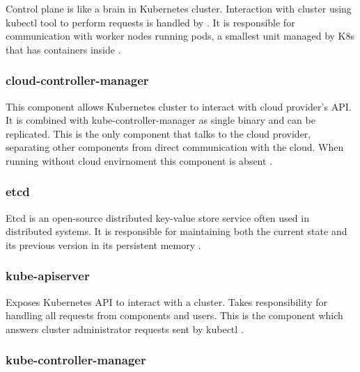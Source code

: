 Control plane is like a brain in Kubernetes cluster. Interaction with cluster using kubectl tool to perform requests is handled by \textit{}. It is responsible for communication with worker nodes running pods, a smallest unit managed by K8s that has containers inside \cite{KubernetesArch}.


\subsubsection{cloud-controller-manager}
\label{sec:cloudControllerManager}

This component allows Kubernetes cluster to interact with cloud provider's API. It is combined with kube-controller-manager as single binary and can be replicated. This is the only component that talks to the cloud provider, separating other components from direct communication with the cloud. When running without cloud envirnoment this component is absent \cite{KubernetesArch}.


\subsubsection{etcd}
\label{sec:etcd}

Etcd is an open-source distributed key-value store service often used in distributed systems. It is responsible for maintaining both the current state and its previous version in its persistent memory \cite{KubernetesArch}\cite{Etcd}.


\subsubsection{kube-apiserver}
\label{sec:kubeApiServer}

Exposes Kubernetes API to interact with a cluster. Takes responsibility for handling all requests from components and users. This is the component which answers cluster administrator requests sent by kubectl \cite{KubernetesArch}.


\subsubsection{kube-controller-manager}
\label{sec:kubeControllerManager}


